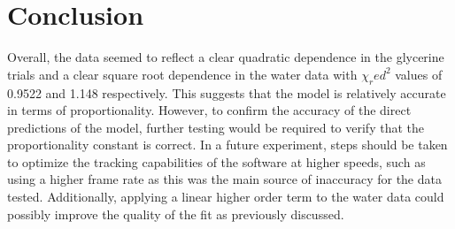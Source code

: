 \documentclass[
	letterpaper
	12pt
]{template}
\begin{document}
\section{Conclusion}
Overall, the data seemed to reflect a clear quadratic dependence in the glycerine trials and a clear square root dependence in the water data with $\chi_red^2$ values of 0.9522 and 1.148 respectively. This suggests that the model is relatively accurate in terms of proportionality. However, to confirm the accuracy of the direct predictions of the model, further testing would be required to verify that the proportionality constant is correct. In a future experiment, steps should be taken to optimize the tracking capabilities of the software at higher speeds, such as using a higher frame rate as this was the main source of inaccuracy for the data tested. Additionally, applying a linear higher order term to the water data could possibly improve the quality of the fit as previously discussed.

\newpage


\newpage


\end{document}
